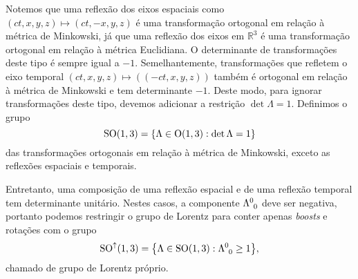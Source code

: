 \documentclass[12pt,a4paper]{article}
\numberwithin{equation}{section}
\DeclarePairedDelimiter\set{\{}{\}}
\begin{document}
Notemos que uma reflexão dos eixos espaciais como \((ct, x,y,z) \mapsto (ct, -x, y, z)\) é uma transformação ortogonal em relação à métrica de Minkowski, já que uma reflexão dos eixos em \(\mathbb{R}^3\) é uma transformação ortogonal em relação à métrica Euclidiana. O determinante de transformações deste tipo é sempre igual a \(-1\). Semelhantemente, transformações que refletem o eixo temporal \((ct, x,y, z) \mapsto ((-ct, x,y, z))\) também é ortogonal em relação à métrica de Minkowski e tem determinante \(-1\). Deste modo, para ignorar transformações deste tipo, devemos adicionar a restrição \(\det \Lambda = 1\). Definimos o grupo
\begin{equation*}
    \mathrm{SO}(1,3) = \set*{\Lambda \in \mathrm{O}(1,3) : \det \Lambda = 1}
\end{equation*}
das transformações ortogonais em relação à métrica de Minkowski, exceto as reflexões espaciais e temporais.

Entretanto, uma composição de uma reflexão espacial e de uma reflexão temporal tem determinante unitário. Nestes casos, a componente \(\Lambda\indices{^0_0}\) deve ser negativa, portanto podemos restringir o grupo de Lorentz para conter apenas \textit{boosts} e rotações com o grupo
\begin{equation*}
    \mathrm{SO}^\uparrow(1,3) = \set*{\Lambda \in \mathrm{SO}(1,3) : \Lambda\indices{^0_0} \geq 1},
\end{equation*}
chamado de grupo de Lorentz próprio.
\end{document}
